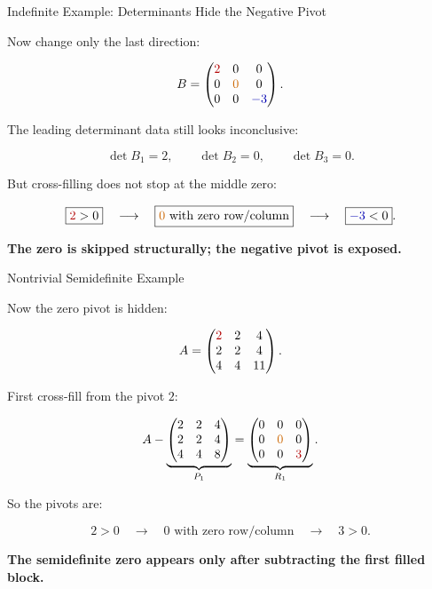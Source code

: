 \documentclass[10pt]{beamer}
\theoremstyle{definition}
\newcommand{\x}[1]{\alert{\textbf{#1}}}
\newcommand{\rd}[1]{{\color{red!70!black}#1}}
\newcommand{\bl}[1]{{\color{blue!70!black}#1}}
\newcommand{\ora}[1]{{\color{orange!80!black}#1}}
\begin{document}
\begin{frame}[shrink=5]{Indefinite Example: Determinants Hide the Negative Pivot}

Now change only the last direction:

\[
B=
\begin{pmatrix}
\rd{2}&0&0\\
0&\ora{0}&0\\
0&0&\bl{-3}
\end{pmatrix}.
\]

\vfill

The leading determinant data still looks inconclusive:

$$
\det B_1=2,\qquad \det B_2=0,\qquad \det B_3=0.
$$

\vfill

But cross-filling does not stop at the middle zero:

$$
\boxed{\rd{2}>0}
\quad\longrightarrow\quad
\boxed{\ora{0}\text{ with zero row/column}}
\quad\longrightarrow\quad
\boxed{\bl{-3}<0}.
$$

\vfill

\begin{center}
\x{The zero is skipped structurally; the negative pivot is exposed.}
\end{center}

\end{frame}


\begin{frame}[shrink=5]{Nontrivial Semidefinite Example}

Now the zero pivot is hidden:

\[
A=
\begin{pmatrix}
\rd{2}&2&4\\
2&2&4\\
4&4&11
\end{pmatrix}.
\]

\vfill

First cross-fill from the pivot $2$:

\[
A-
\underbrace{
\begin{pmatrix}
2&2&4\\
2&2&4\\
4&4&8
\end{pmatrix}}_{P_1}
=
\underbrace{
\begin{pmatrix}
0&0&0\\
0&\ora{0}&0\\
0&0&\rd{3}
\end{pmatrix}}_{R_1}.
\]

\vfill

So the pivots are:

$$
\boxed{2>0}\quad\longrightarrow\quad
\boxed{0\text{ with zero row/column}}\quad\longrightarrow\quad
\boxed{3>0}.
$$

\begin{center}
\x{The semidefinite zero appears only after subtracting the first filled block.}
\end{center}

\end{frame}
\end{document}
